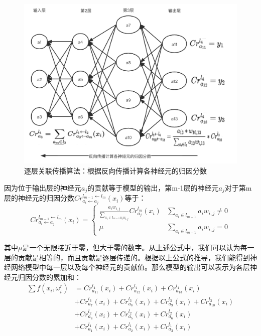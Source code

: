 \begin{figure}[!hbt]
\centering
	\includegraphics[scale=0.3]{fig2/C3/自适应-反向传播}%
	\caption{逐层关联传播算法：根据反向传播计算各神经元的归因分数}
	\label{fig:逐层关联传播算法：根据反向传播计算各神经元的归因分数}	
\end{figure}

因为位于输出层的神经元$a_{j}$的贡献等于模型的输出，第m-1层的神经元$a_{j}$对于第m层的神经元的归因分数$Cr_{a_{i} \leftarrow a_{j}}^{l_{m-1} \leftarrow l_{m}}\left(x_{i}\right)$等于：
\begin{equation}
Cr_{a_{i} \leftarrow a_{j}}^{l_{m-1} \leftarrow l_{m}}\left(x_{i}\right)=\left\{\begin{array}{cc}\frac{a_{i} w_{i, j}}{\sum_{a_{i} \in l_{m-1} a_{i} w_{i, j}}} Cr_{a_{j}}^{l_{m}}\left(x_{i}\right) & \sum_{a_{i} \in l_{m-1}} a_{i} w_{i, j} \neq 0 \\ \mu & \sum_{a_{i} \in l_{m-1}} a_{i} w_{i, j}=0\end{array}\right.
\end{equation}

其中$\mu$是一个无限接近于零，但大于零的数字。从上述公式中，我们可以认为每一层的贡献是相等的，而且贡献是逐层传递的。根据以上公式的推导，我们能得到神经网络模型中每一层以及每个神经元的贡献值。那么模型的输出可以表示为各层神经元归因分数的累加和：
$$
\begin{aligned}
\sum f\left(x_{i}, \omega_{i}^{r}\right) &=Cr_{a_{11}}^{l_{4}}\left(x_{i}\right)+Cr_{a_{12}}^{l_{4}}\left(x_{i}\right)+Cr_{a_{13}}^{l_{4}}\left(x_{i}\right)\\
&+Cr_{a_{7}}^{l_{3}}\left(x_{i}\right)+Cr_{a_{8}}^{l_{3}}\left(x_{i}\right)+Cr_{a_{9}}^{l_{3}}\left(x_{i}\right)+Cr_{a_{10}}^{l_{3}}\left(x_{i}\right)\\
&+Cr_{a_{4}}^{l_{2}}\left(x_{i}\right)+Cr_{a_{5}}^{l_{2}}\left(x_{i}\right)+Cr_{a_{6}}^{l_{2}}\left(x_{i}\right)\\
&+Cr_{a_{1}}^{l_{1}}\left(x_{i}\right)+Cr_{a_{2}}^{l_{1}}\left(x_{i}\right)+Cr_{a_{3}}^{l_{1}}\left(x_{i}\right)
\end{aligned}
$$

